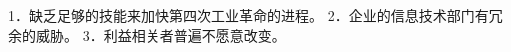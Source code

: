 \documentclass[a4paper]{book}
\makeatletter
\newcommand{\voidenvironment}[1]{%
  \expandafter\providecommand\csname env@#1@save@env\endcsname{}%
  \expandafter\providecommand\csname env@#1@process\endcsname{}%
  \@ifundefined{#1}{}{\RenewEnviron{#1}{}}%
}
\numberwithin{equation}{chapter}
\theoremstyle{definition}
\makeatother
\begin{document}
1．缺乏足够的技能来加快第四次工业革命的进程。
2．企业的信息技术部门有冗余的威胁。
3．利益相关者普遍不愿意改变。
%
%
%
%
%
%
%
%
%
%
%
%
%
%
%
%
%
%
\end{document}
